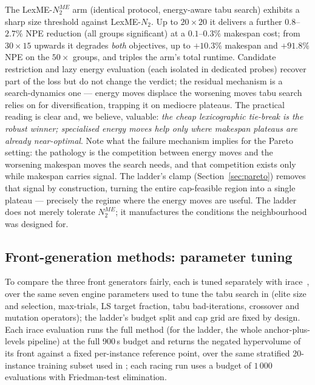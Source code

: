 \documentclass[preprint,12pt]{elsarticle}
\begin{document}
The LexME-$N_2^{ME}$ arm (identical protocol, energy-aware tabu search)
exhibits a sharp size threshold against LexME-$N_2$. Up to $20{\times}20$
it delivers a further $0.8$--$2.7\%$ NPE reduction (all groups
significant) at a $0.1$--$0.3\%$ makespan cost; from $30{\times}15$
upwards it degrades \emph{both} objectives, up to $+10.3\%$ makespan and
$+91.8\%$ NPE on the $50{\times}$ groups, and triples the arm's total
runtime. Candidate restriction and lazy energy evaluation (each isolated
in dedicated probes) recover part of the loss but do not change the
verdict; the residual mechanism is a search-dynamics one --- energy moves
displace the worsening moves tabu search relies on for diversification,
trapping it on mediocre plateaus. The practical reading is clear and, we
believe, valuable: \emph{the cheap lexicographic tie-break is the robust
winner; specialised energy moves help only where makespan plateaus are
already near-optimal}. Note what the failure mechanism implies for the
Pareto setting: the pathology is the competition between energy moves and
the worsening makespan moves the search needs, and that competition exists
only while makespan carries signal. The ladder's clamp
(Section~\ref{sec:pareto}) removes that signal by construction, turning the
entire cap-feasible region into a single plateau --- precisely the regime
where the energy moves are useful. The ladder does not merely tolerate
$N_2^{ME}$; it manufactures the conditions the neighbourhood was designed
for.

\subsection{Front-generation methods: parameter tuning}
\label{sec:exp-tuning}

To compare the three front generators fairly, each is tuned separately
with irace~\cite{Lopez2016}, over the same seven engine parameters used to
tune the tabu search in \cite{DiazTabu2026} (elite size and selection,
max-trials, LS target fraction, tabu bad-iterations, crossover and
mutation operators); the ladder's budget split and cap grid are fixed by
design. Each irace evaluation runs the full method (for the ladder, the
whole anchor-plus-levels pipeline) at the full 900\,s budget and returns the
negated hypervolume of its front against a fixed per-instance reference
point, over the same stratified 20-instance training subset used in
\cite{DiazTabu2026}; each racing run uses a budget of $1\,000$ evaluations
with Friedman-test elimination.
\end{document}
